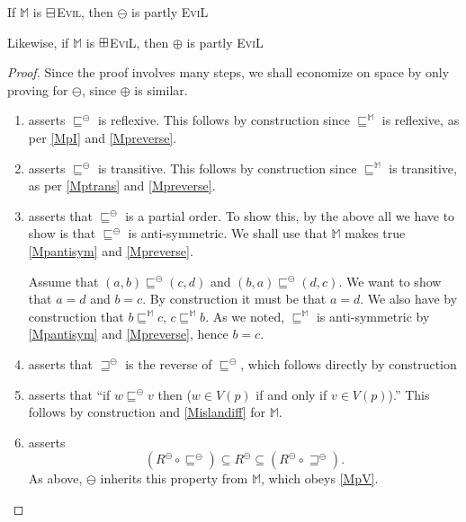 \begin{lemma}
If $\mathbb{M}$ is $\boxminus$\textsc{Evil}, then $\ominus$ is
partly \textsc{EviL}

Likewise, if $\mathbb{M}$ is $\boxplus$\textsc{EviL}, then $\oplus$ is
partly \textsc{EviL}
\end{lemma}
\begin{proof}
Since the proof involves many steps, we shall economize on space by
only proving for $\ominus$, since $\oplus$ is similar.
\begin{enumerate}[label=\textup{(\emph{\Roman*})$'$}, topsep=0.0in,
  parsep=0.075in]
\item asserts $\sqsubseteq^\ominus$ is reflexive.  This follows by
  construction since $\sqsubseteq^\mathbb{M}$ is reflexive, as per
  \ref{MpI} and \ref{Mpreverse}.
\item asserts $\sqsubseteq^\ominus$ is transitive.  This follows by
  construction since $\sqsubseteq^\mathbb{M}$ is transitive, as per
  \ref{Mptrans} and \ref{Mpreverse}.
\item asserts that $\sqsubseteq^\ominus$ is a partial order. To show
  this, by the above all we have to show is that $\sqsubseteq^\ominus$ is anti-symmetric.  
  We shall use that $\mathbb{M}$ makes true \ref{Mpantisym} and \ref{Mpreverse}. 
  
  Assume that $(a,b) \sqsubseteq^{\ominus} (c,d)$ and $(b,a)
  \sqsubseteq^{\ominus} (d,c)$.  We want to show that $a =d$ and $b
  =c$.    By construction it must be that $a = d$.  
  We also have by construction that $b \sqsubseteq^{\mathbb{M}} c$, $c
  \sqsubseteq^{\mathbb{M}} b$.  
  As we noted, $\sqsubseteq^{\mathbb{M} }$ is anti-symmetric by \ref{Mpantisym} and \ref{Mpreverse}, 
  hence $b = c$. 
\item asserts that $\sqsupseteq^\ominus$ is the reverse of
  $\sqsubseteq^\ominus$, which follows directly by construction
\item asserts that ``if $w \sqsubseteq^\ominus v$ then ($w \in V (p)$
  if and only if $v \in V (p)$).''  This follows by construction and
  \ref{Mislandiff} for $\mathbb{M}$.
\item asserts  \[(R^{\ominus} \circ \sqsubseteq^{\ominus}) \subseteq
    R^{\ominus} \subseteq (R^{\ominus} \circ \sqsupseteq^{\ominus}).\]
As above, $\ominus$ inherits this property from $\mathbb{M}$, which
obeys \ref{MpV}.


\end{enumerate}
\end{proof}
